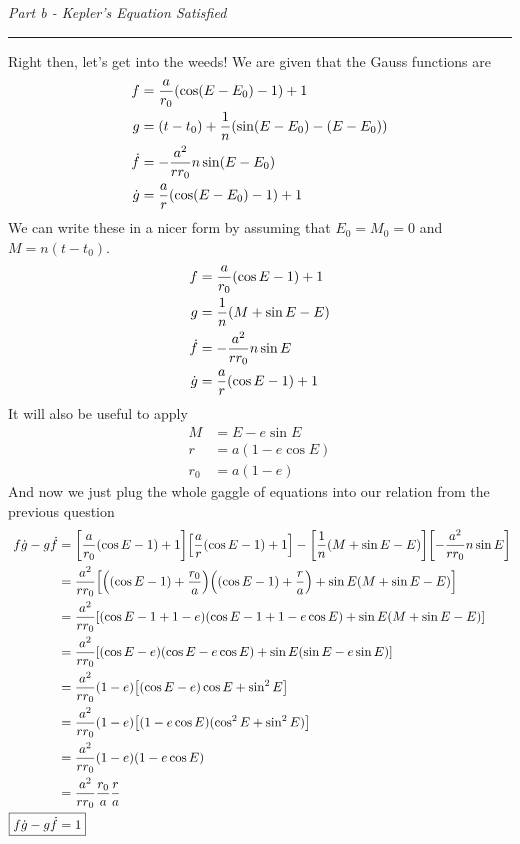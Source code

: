\documentclass[12pt, letterpaper, twoside]{article}
\newcommand{\question}[1]{{\noindent \it #1}}
\newcommand{\answer}[1]{
    \par\noindent\rule{\textwidth}{0.4pt}#1\vspace{0.5cm}
}
\begin{document}
\question{Part b - Kepler's Equation Satisfied}
\answer{
    Right then, let's get into the weeds! We are given that the Gauss functions are
    \begin{align}
        f &= \frac{a}{r_0} \qty(\cos (E - E_0) - 1) + 1 \\
        g &= (t - t_0) + \frac{1}{n} \qty(\sin(E - E_0) - (E - E_0)) \\
        \dot{f} &= -\frac{a^2}{r r_0} n \sin (E - E_0) \\
        \dot{g} &= \frac{a}{r} \qty(\cos (E - E_0) - 1) + 1
    \end{align}
    We can write these in a nicer form by assuming that $E_0 = M_0 = 0$ and $M = n (t - t_0)$.
    \begin{align}
        f &= \frac{a}{r_0} \qty(\cos E - 1) + 1 \\
        g &= \frac{1}{n} \qty(M + \sin E - E) \\
        \dot{f} &= -\frac{a^2}{r r_0} n \sin E \\
        \dot{g} &= \frac{a}{r} \qty(\cos E - 1) + 1
    \end{align}
    It will also be useful to apply
    \begin{align}
        M &= E - e \sin E \\
        r &= a (1 - e \cos E) \\
        r_0 &= a (1 - e)
    \end{align}
    And now we just plug the whole gaggle of equations into our relation from the previous question
    \begin{align}
        f \dot{g} - g \dot{f} &= \qty[\frac{a}{r_0} \qty(\cos E - 1) + 1] \qty[\frac{a}{r} \qty(\cos E - 1) + 1] - \qty[\frac{1}{n} \qty(M + \sin E - E)] \qty[-\frac{a^2}{r r_0} n \sin E] \\
        &= \frac{a^2}{r r_0} \qty[ \qty(\qty(\cos E - 1) + \frac{r_0}{a}) \qty(\qty(\cos E - 1) + \frac{r}{a}) + \sin E \qty(M + \sin E - E)] \\
        &= \frac{a^2}{r r_0} \qty[ \qty(\cos E - 1 + 1 - e) \qty(\cos E - 1 + 1 - e \cos E) + \sin E \qty(M + \sin E - E)] \\
        &= \frac{a^2}{r r_0} \qty[ \qty(\cos E - e) \qty(\cos E - e \cos E) + \sin E \qty(\sin E - e \sin E)] \\
        &= \frac{a^2}{r r_0} (1 - e) \qty[ \qty(\cos E - e) \cos E + \sin^2 E] \\
        &= \frac{a^2}{r r_0} (1 - e) \qty[ (1 - e \cos E) (\cos^2 E + \sin^2 E)] \\
        &= \frac{a^2}{r r_0} (1 - e) (1 - e \cos E) \\
        &= \frac{a^2}{r r_0} \frac{r_0}{a} \frac{r}{a} \\
        \Aboxed{ f \dot{g} - g \dot{f}&= 1 }
    \end{align}
}
\end{document}
